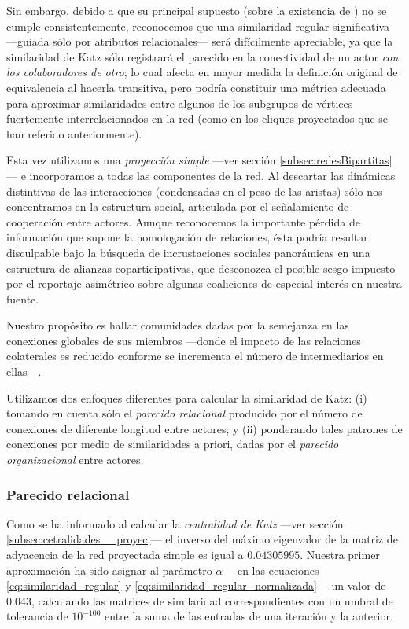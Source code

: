 \documentclass[letterpaper, 11pt]{book}
\theoremstyle{definition}
\theoremstyle{remark}
\begin{document}
Sin embargo, debido a que su principal supuesto (sobre la existencia de ) no se cumple consistentemente, reconocemos que una similaridad regular significativa ---guiada sólo por atributos relacionales--- será difícilmente apreciable, ya que la similaridad de Katz sólo registrará el parecido en la conectividad de un actor \emph{con los colaboradores de otro}; lo cual afecta en mayor medida la definición original de equivalencia al hacerla transitiva, pero podría constituir una métrica adecuada para aproximar similaridades entre algunos de los subgrupos de vértices fuertemente interrelacionados en la red (como en los cliques proyectados que se han referido anteriormente). 


Esta vez utilizamos una \emph{proyección simple} ---ver sección \ref{subsec:redesBipartitas}--- e incorporamos a todas las componentes de la red. 
Al descartar las dinámicas distintivas de las interacciones (condensadas en el peso de las aristas) sólo nos concentramos en la estructura social, articulada por el señalamiento de cooperación entre actores. 
Aunque reconocemos la importante pérdida de información que supone la homologación de relaciones, ésta podría resultar disculpable bajo la búsqueda de incrustaciones sociales panorámicas en una estructura de alianzas coparticipativas, que desconozca el posible sesgo impuesto por el reportaje asimétrico sobre algunas coaliciones de especial interés en nuestra fuente. 

Nuestro propósito es hallar comunidades dadas por la semejanza en las conexiones globales de sus miembros ---donde el impacto de las relaciones colaterales es reducido conforme se incrementa el número de intermediarios en ellas---. 

Utilizamos dos enfoques diferentes para calcular la similaridad de Katz: 
(i) tomando en cuenta sólo el \emph{parecido relacional} producido por el número de conexiones de diferente longitud entre actores; 
y (ii) ponderando tales patrones de conexiones por medio de similaridades a priori, dadas por el \emph{parecido organizacional} entre actores. 



\subsubsection{Parecido relacional}
\label{subsubsection:similaridadRegRed__proyec}

Como se ha informado al calcular la \emph{centralidad de Katz} ---ver sección \ref{subsec:cetralidades__proyec}--- el inverso del máximo eigenvalor de la matriz de adyacencia de la red proyectada simple es igual a $0.04305995$. 
Nuestra primer aproximación ha sido asignar al parámetro $\alpha$ ---en las ecuaciones \ref{eq:similaridad_regular} y \ref{eq:similaridad_regular_normalizada}--- un valor de 0.043, calculando las matrices de similaridad correspondientes con un umbral de tolerancia de $10^{-100}$ entre la suma de las entradas de una iteración y la anterior. 
\end{document}
